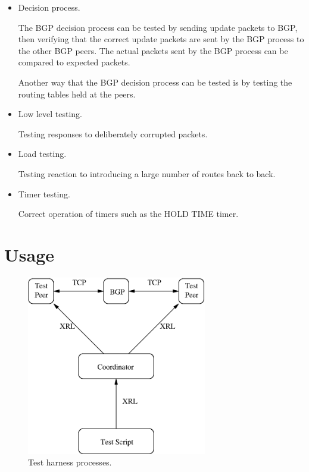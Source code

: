 \documentclass[11pt]{article}
\begin{document}
\begin{itemize}

  \item Decision process.

  The BGP decision process can be tested by sending update packets to
  BGP, then verifying that the correct update packets are sent by the
  BGP process to the other BGP peers. The actual packets sent by the
  BGP process can be compared to expected packets. 

  Another way that the BGP decision process can be tested is by
  testing the routing tables held at the peers.

  \item Low level testing.

  Testing responses to deliberately corrupted packets.

  \item Load testing. 

  Testing reaction to introducing a large number of routes back
  to back.

  \item Timer testing.

  Correct operation of timers such as the HOLD TIME timer.

\end{itemize}

\section{Usage}

\begin{figure}[htbp]
\centerline{\includegraphics[width=0.70\textwidth]{figs/harness}}
\caption{\label{fig:harness}Test harness processes.}
\end{figure}
\end{document}
